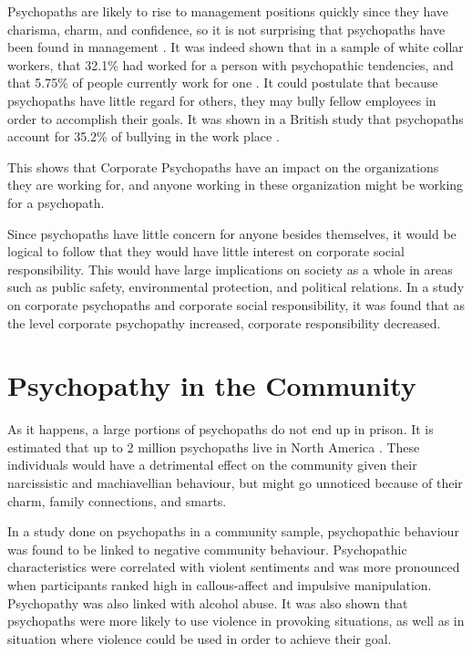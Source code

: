 \documentclass[12pt,jou]{apa}
\begin{document}
Psychopaths are likely to rise to management positions quickly since they have charisma, charm, and confidence, so it is not surprising that psychopaths have been found in management \cite{ruthlesspsych}. It was indeed shown that in a sample of white collar workers, that 32.1\% had worked for a person with psychopathic tendencies, and that 5.75\% of people currently work for one \cite{ruthlesspsych}. It could postulate that because psychopaths have little regard for others, they may bully fellow employees in order to accomplish their goals. It was shown in a British study that psychopaths account for 35.2\% of bullying in the work place \cite{managepsych}. 

This shows that Corporate Psychopaths have an impact on the organizations they are working for, and anyone working in these organization might be working for a psychopath. 

Since psychopaths have little concern for anyone besides themselves, it would be logical to follow that they would have little interest on corporate social responsibility. This would have large implications on society as a whole in areas such as public safety, environmental protection, and political relations. In a study on corporate psychopaths and corporate social responsibility, it was found that as the level corporate psychopathy increased, corporate responsibility decreased. \cite{organizepsych}

\section{Psychopathy in the Community}

As it happens, a large portions of psychopaths do not end up in prison. It is estimated that up to 2 million psychopaths live in North America \cite<as cited in>{commpsych}. These individuals would have a detrimental effect on the community given their narcissistic and machiavellian behaviour, but might go unnoticed because of their charm, family connections, and smarts. 

In a study done on psychopaths in a community sample, psychopathic behaviour was found to be linked to negative community behaviour. Psychopathic characteristics were correlated with violent sentiments and was more pronounced when participants ranked high in callous-affect and impulsive manipulation. Psychopathy was also linked with alcohol abuse. It was also shown that psychopaths were more likely to use violence in provoking situations, as well as in situation where violence could be used in order to achieve their goal. \cite{commpsych}
\end{document}
